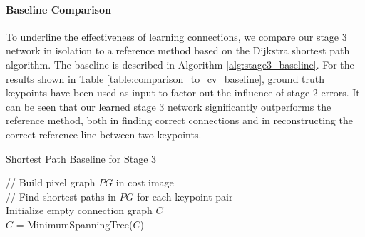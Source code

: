 \documentclass[10pt,twocolumn,letterpaper]{article}
\begin{document}
\paragraph{Baseline Comparison} To underline the effectiveness of learning connections, we compare our stage 3 network in isolation to a reference method based on the Dijkstra shortest path algorithm. The baseline is described in Algorithm \ref{alg:stage3_baseline}. For the results shown in Table \ref{table:comparison_to_cv_baseline}, ground truth keypoints have been used as input to factor out the influence of stage 2 errors. It can be seen that our learned stage 3 network significantly outperforms the reference method, both in finding correct connections and in reconstructing the correct reference line between two keypoints.
\begin{table}
\caption{Quantitative evaluation of stage 3 compared to the baseline shortest path method.}
\label{table:comparison_to_cv_baseline}
\centering
{}
\end{table}
\begin{algorithm}
\caption{Shortest Path Baseline for Stage 3}
\label{alg:stage3_baseline}
// Build pixel graph $PG$ in cost image\\
// Find shortest paths in $PG$ for each keypoint pair\\
Initialize empty connection graph $C$\\
$C$ = MinimumSpanningTree($C$)
\end{algorithm}
\end{document}
